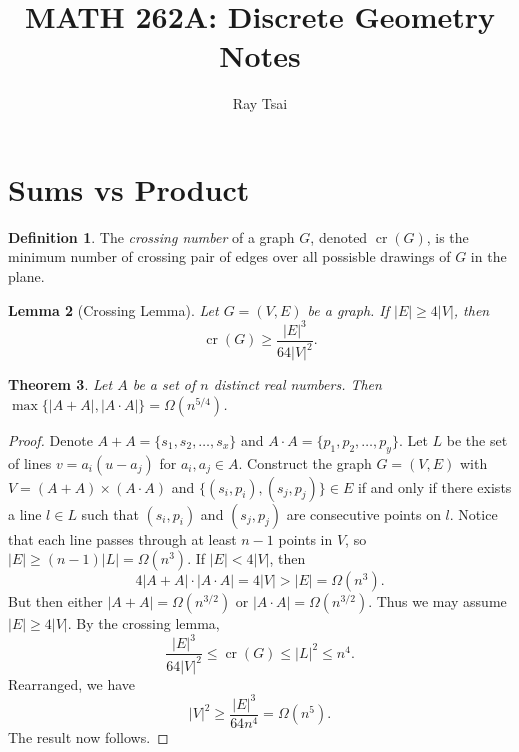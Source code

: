\documentclass[12pt,reqno]{amsart}
\newtheorem{theorem}{Theorem}[section]
\newtheorem{lemma}[theorem]{Lemma}
\theoremstyle{definition}
\newtheorem{definition}[theorem]{Definition}
\theoremstyle{remark}
\renewcommand{\leq}{\leqslant}
\renewcommand{\geq}{\geqslant}
\def\cr{\operatorname{cr}}
\numberwithin{equation}{section}
\begin{document}
\title[MATH 262A: Discrete Geometry]{MATH 262A: Discrete Geometry Notes}



\author{Ray Tsai}

\onehalfspace

\maketitle

\tableofcontents

\newpage

\section{Sums vs Product}

\begin{definition}
	The \textit{crossing number} of a graph $G$, denoted $\cr(G)$, is the minimum number of crossing pair of edges over all possisble drawings of $G$ in the plane.
\end{definition}

\begin{lemma}[Crossing Lemma]\label{lem:crossing}
	Let $G = (V, E)$ be a graph. If $|E| \geq 4|V|$, then
	\[
		\cr(G) \geq \frac{|E|^3}{64|V|^2}.
	\]
\end{lemma}

\begin{theorem}\label{thm:sumprod}
	Let $A$ be a set of $n$ distinct real numbers. Then $\max\{|A + A|, |A \cdot A|\} = \Omega(n^{5/4})$.
\end{theorem}

\begin{proof}
	Denote $A + A = \{s_1, s_2, \ldots, s_x\}$ and $A \cdot A = \{p_1, p_2, \ldots, p_y\}$. Let $L$ be the set of lines $v = a_i(u - a_j)$ for $a_i, a_j \in A$. Construct the graph $G = (V, E)$ with $V = (A + A) \times (A \cdot A)$ and $\{(s_i, p_i), (s_j, p_j)\} \in E$ if and only if there exists a line $l \in L$ such that $(s_i, p_i)$ and $(s_j, p_j)$ are consecutive points on $l$. Notice that each line passes through at least $n - 1$ points in $V$, so $|E| \geq (n - 1)|L| = \Omega(n^3)$. If $|E| < 4|V|$, then 
	\[
		4|A + A| \cdot |A \cdot A| = 4|V| > |E| = \Omega(n^3).
	\]
	But then either $|A + A| = \Omega(n^{3/2})$ or $|A \cdot A| = \Omega(n^{3/2})$. Thus we may assume $|E| \geq 4|V|$. By the crossing lemma, 
	\[
		\frac{|E|^3}{64|V|^2} \leq \cr(G) \leq |L|^2 \leq n^4.
	\]
	Rearranged, we have
	\[
		|V|^2 \geq \frac{|E|^{3}}{64n^4} = \Omega(n^{5}).
	\]
	The result now follows.
\end{proof}
\end{document}
